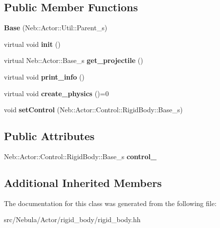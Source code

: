 \subsection*{Public Member Functions}
\begin{DoxyCompactItemize}
\item 
\hypertarget{classNeb_1_1Actor_1_1RigidBody_1_1Base_ae20c50935510fa8d3eee87010da087a0}{{\bfseries Base} (Neb\-::\-Actor\-::\-Util\-::\-Parent\-\_\-s)}\label{classNeb_1_1Actor_1_1RigidBody_1_1Base_ae20c50935510fa8d3eee87010da087a0}

\item 
\hypertarget{classNeb_1_1Actor_1_1RigidBody_1_1Base_af3732712c0867fa7fa3c4d57442d6e99}{virtual void {\bfseries init} ()}\label{classNeb_1_1Actor_1_1RigidBody_1_1Base_af3732712c0867fa7fa3c4d57442d6e99}

\item 
\hypertarget{classNeb_1_1Actor_1_1RigidBody_1_1Base_ac01f0719fc0af06f286a89f6805e3c82}{virtual Neb\-::\-Actor\-::\-Base\-\_\-s {\bfseries get\-\_\-projectile} ()}\label{classNeb_1_1Actor_1_1RigidBody_1_1Base_ac01f0719fc0af06f286a89f6805e3c82}

\item 
\hypertarget{classNeb_1_1Actor_1_1RigidBody_1_1Base_a94184455c508f43845009606f70b9d7f}{virtual void {\bfseries print\-\_\-info} ()}\label{classNeb_1_1Actor_1_1RigidBody_1_1Base_a94184455c508f43845009606f70b9d7f}

\item 
\hypertarget{classNeb_1_1Actor_1_1RigidBody_1_1Base_a8c59f06c4487432769c93566f01b81dd}{virtual void {\bfseries create\-\_\-physics} ()=0}\label{classNeb_1_1Actor_1_1RigidBody_1_1Base_a8c59f06c4487432769c93566f01b81dd}

\item 
\hypertarget{classNeb_1_1Actor_1_1RigidBody_1_1Base_a13dd372df1d14fb3d8502d8b4c7a9528}{void {\bfseries set\-Control} (Neb\-::\-Actor\-::\-Control\-::\-Rigid\-Body\-::\-Base\-\_\-s)}\label{classNeb_1_1Actor_1_1RigidBody_1_1Base_a13dd372df1d14fb3d8502d8b4c7a9528}

\end{DoxyCompactItemize}
\subsection*{Public Attributes}
\begin{DoxyCompactItemize}
\item 
\hypertarget{classNeb_1_1Actor_1_1RigidBody_1_1Base_a2de60916961ec44a1c4f6781a8f25a52}{Neb\-::\-Actor\-::\-Control\-::\-Rigid\-Body\-::\-Base\-\_\-s {\bfseries control\-\_\-}}\label{classNeb_1_1Actor_1_1RigidBody_1_1Base_a2de60916961ec44a1c4f6781a8f25a52}

\end{DoxyCompactItemize}
\subsection*{Additional Inherited Members}


The documentation for this class was generated from the following file\-:\begin{DoxyCompactItemize}
\item 
src/\-Nebula/\-Actor/rigid\-\_\-body/rigid\-\_\-body.\-hh\end{DoxyCompactItemize}
